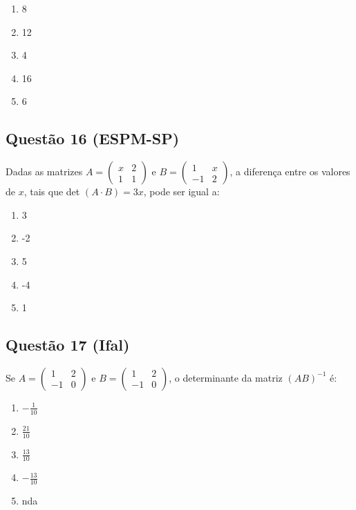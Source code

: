 \documentclass{article}
\begin{document}
\begin{multicols}{2}
		\begin{enumerate}[label=(\Alph*), noitemsep]
			\item 8
			\item 12
			\item 4
			\item 16
			\item 6
		\end{enumerate}
		
		\subsection*{Questão 16 (ESPM-SP)}
		Dadas as matrizes \( A = \begin{pmatrix} x & 2 \\ 1 & 1 \end{pmatrix} \) e \( B = \begin{pmatrix} 1 & x \\ -1 & 2 \end{pmatrix} \), a diferença entre os valores de \( x \), tais que det \( (A \cdot B) = 3x \), pode ser igual a:
		
		\begin{enumerate}[label=(\Alph*), noitemsep]
			\item 3
			\item -2
			\item 5
			\item -4
			\item 1
		\end{enumerate}
		
		\subsection*{Questão 17 (Ifal)}
		Se \( A = \begin{pmatrix} 1 & 2 \\ -1 & 0 \end{pmatrix} \) e \( B = \begin{pmatrix} 1 & 2 \\ -1 & 0 \end{pmatrix} \), o determinante da matriz \( (AB)^{-1} \) é:
		
		\begin{enumerate}[label=(\Alph*), noitemsep]
			\item \( -\frac{1}{10} \)
			\item \( \frac{21}{10} \)
			\item \( \frac{13}{10} \)
			\item \( -\frac{13}{10} \)
			\item nda
		\end{enumerate}
		

\end{multicols}
\end{document}
